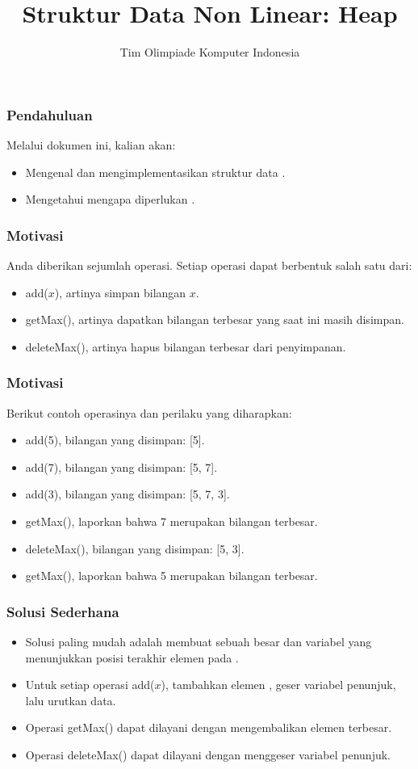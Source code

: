 

\title{Struktur Data Non Linear: \newline Heap}
\author{Tim Olimpiade Komputer Indonesia}
\date{}



\begin{frame}
\titlepage
\end{frame}

\begin{frame}
\frametitle{Pendahuluan}
Melalui dokumen ini, kalian akan:
\begin{itemize}
  \item Mengenal dan mengimplementasikan struktur data \pheap.
  \item Mengetahui mengapa diperlukan \pheap.
\end{itemize}
\end{frame}

\begin{frame}
\frametitle{Motivasi}
Anda diberikan sejumlah operasi. Setiap operasi dapat berbentuk salah satu dari:
\begin{itemize}
  \item add($x$), artinya simpan bilangan $x$.
  \item getMax(), artinya  dapatkan bilangan terbesar yang saat ini masih disimpan.
  \item deleteMax(), artinya  hapus bilangan terbesar dari penyimpanan.
\end{itemize}
\end{frame}

\begin{frame}
\frametitle{Motivasi}
Berikut contoh operasinya dan perilaku yang diharapkan:
\begin{itemize}
  \item add(5), bilangan yang disimpan: [5].
  \item add(7), bilangan yang disimpan: [5, 7].
  \item add(3), bilangan yang disimpan: [5, 7, 3].
  \item getMax(), laporkan bahwa 7 merupakan bilangan terbesar.
  \item deleteMax(), bilangan yang disimpan: [5, 3].
  \item getMax(), laporkan bahwa 5 merupakan bilangan terbesar.
\end{itemize}
\end{frame}

\begin{frame}
\frametitle{Solusi Sederhana}
\begin{itemize}
  \item Solusi paling mudah adalah membuat sebuah \farray besar dan variabel yang menunjukkan posisi terakhir elemen pada \farray.
  \item Untuk setiap operasi add($x$), tambahkan elemen \farray, geser variabel penunjuk, lalu urutkan data. 
  \item Operasi getMax() dapat dilayani dengan mengembalikan elemen terbesar.
  \item Operasi deleteMax() dapat dilayani dengan menggeser variabel penunjuk.
\end{itemize}
\end{frame}

